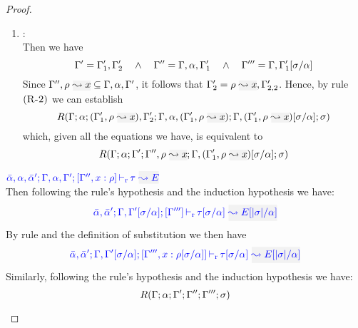 \begin{proof}
\begin{description}
\begin{enumerate}
  \item {}: \\
   Then we have
\begin{equation*}
  \Gamma' = \Gamma_1',\Gamma_2'  \quad\wedge\quad \Gamma'' = \Gamma,\alpha,\Gamma_1' \quad\wedge\quad 
      \Gamma''' = \Gamma,\Gamma_1'[\sigma/\alpha]
\end{equation*}
  Since $\tenv'',\ie{\rulet}{x} \subseteq \tenv,\alpha,\tenv'$, it follows that $\tenv_2' = \ie{\rulet}{x},\tenv_{2,2}'$.
  Hence, by rule $\mbox{({\tt\sc R-2})}$ we can establish
\begin{equation*}
R(\tenv;\alpha;(\tenv_1',\ie{\rulet}{x}),\tenv_2';\tenv,\alpha,(\tenv_1',\ie{\rulet}{x});\tenv,(\tenv_1',\ie{\rulet}{x})[\suty/\alpha];\suty)
\end{equation*}
        which, given all the equations we have, is equivalent to
\begin{equation*}
R(\tenv;\alpha;\tenv';\tenv'',\ie{\rulet}{x};\tenv,(\tenv_1',\ie{\rulet}{x})[\suty/\alpha];\suty)
\end{equation*}
  \end{enumerate}
  
\item[\fbox{\rref{L-Var}}]\quad$\dlres{\bar{\alpha},\alpha,\bar{\alpha}'}{\tenv,\alpha,\tenv'}{\tenv'', \relation{x}{\rulet}}{\type}{E}$\\

Then following the rule's hypothesis and the induction hypothesis we have:
\begin{equation*}
  \dlres{\bar{\alpha},\bar{\alpha}'}{\tenv,\tenv'[\suty/\alpha]}{\tenv'''}{\type[\suty/\alpha]}{E[|\suty|/\alpha]}
\end{equation*}
  By rule  and the definition of substitution we then have
\begin{equation*}
  \dlres{\bar{\alpha},\bar{\alpha}'}{\tenv,\tenv'[\suty/\alpha]}{\tenv''',\relation{x}{\rulet[\suty/\alpha]}}{\type[\suty/\alpha]}{E[|\suty|/\alpha]}
\end{equation*}
  Similarly, following the rule's hypothesis and the induction hypothesis we have:
\begin{equation*}
  R(\Gamma;\alpha;\Gamma';\Gamma'';\Gamma''';\sigma)
\end{equation*}


\end{description}
\end{proof}
